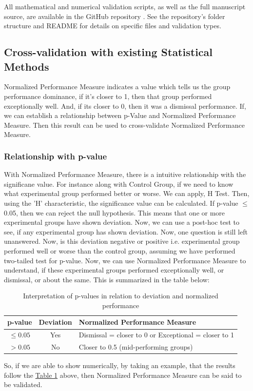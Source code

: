 \documentclass[man,floatsintext]{apa7}
\begin{document}
All mathematical and numerical validation scripts, as well as the full manuscript source, are available in the GitHub repository \cite{silentkarmi2025normalized}. See the repository's folder structure and README for details on specific files and validation types.

\subsection{Cross-validation with existing Statistical Methods}
Normalized Performance Measure indicates a value which tells us the group performance dominance, if it's closer to 1, then that group performed exceptionally well. And, if its closer to 0, then it was a dismissal performance. If, we can establish a relationship between p-Value and Normalized Performance Measure. Then this result can be used to cross-validate Normalized Performance Measure.

\subsubsection{Relationship with p-value}
With Normalized Performance Measure, there is a intuitive relationship with the significane value. For instance along with Control Group, if we need to know what experimental group performed better or worse. We can apply, \cite{kruskal1952use} H Test. Then, using the 'H' characteristic, the significance value can be calculated. If p-value $\le$ 0.05, then we can reject the null hypothesis. This means that one or more experimental groups have shown deviation. Now, we can use a post-hoc \cite{dunnett1955multiple} test to see, if any experimental group has shown deviation. Now, one question is still left unanswered. Now, is this deviation negative or positive i.e. experimental group performed well or worse than the control group, assuming we have performed two-tailed test for p-value. Now, we can use Normalized Performance Measure to understand, if these experimental groups performed exceptionally well, or dismissal, or about the same.
This is summarized in the table below:
\begin{table}[!htbp]
	\centering
	\begin{tabular}{|c|c|l|}
		\hline
		\textbf{p-value} & \textbf{Deviation} & \textbf{Normalized Performance Measure} \\
		\hline
		$\leq 0.05$ & Yes & Dismissal = closer to 0 or Exceptional = closer to 1 \\
		\hline
		$> 0.05$ & No & Closer to 0.5 (mid-performing groups) \\
		\hline
	\end{tabular}
	\vspace{2pt}
	\caption{Interpretation of p-values in relation to deviation and normalized performance}
	\label{table:p-value-relationship}
\end{table}
So, if we are able to show numerically, by taking an example, that the results follow the \hyperref[table:p-value-relationship]{Table 1} above, then Normalized Performance Measure can be said to be validated.
\end{document}
